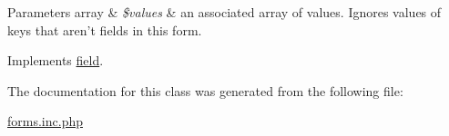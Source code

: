 \begin{DoxyParams}[1]{Parameters}
array & {\em \$values} & an associated array of values. Ignores values of keys that aren't fields in this form. \\
\hline
\end{DoxyParams}


Implements \hyperlink{interfacefield_a54958a09bc0dcd947d611b14741c5996}{field}.



The documentation for this class was generated from the following file\-:\begin{DoxyCompactItemize}
\item 
\hyperlink{forms_8inc_8php}{forms.\-inc.\-php}\end{DoxyCompactItemize}
